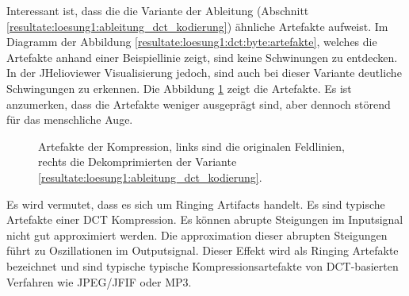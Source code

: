 Interessant ist, dass die die Variante der Ableitung (Abschnitt \ref{resultate:loesung1:ableitung_dct_kodierung}) ähnliche Artefakte aufweist. Im Diagramm der Abbildung \ref{resultate:loesung1:dct:byte:artefakte}, welches die Artefakte anhand einer Beispiellinie zeigt, sind keine Schwinungen zu entdecken. In der JHelioviewer Visualisierung jedoch, sind auch bei dieser Variante deutliche Schwingungen zu erkennen. Die Abbildung \ref{resultate:loesung1:dct:randbehandlung:jvhartefakte_loesung6} zeigt die Artefakte. Es ist anzumerken, dass die Artefakte weniger ausgeprägt sind, aber dennoch störend für das menschliche Auge.\\
\begin{figure}[!htbp]
	\center
	\caption{Artefakte der Kompression, links sind die originalen Feldlinien, rechts die Dekomprimierten der Variante \ref{resultate:loesung1:ableitung_dct_kodierung}.}
	\label{resultate:loesung1:dct:randbehandlung:jvhartefakte_loesung6}
\end{figure}
Es wird vermutet, dass es sich um Ringing Artifacts \cite{wiki:ringing:artefacts} handelt. 
Es sind typische Artefakte einer DCT Kompression. Es können abrupte Steigungen im Inputsignal nicht gut approximiert werden. Die approximation dieser abrupten Steigungen führt zu Oszillationen im Outputsignal. Dieser Effekt wird als Ringing Artefakte bezeichnet und sind typische typische Kompressionsartefakte von DCT-basierten Verfahren wie JPEG/JFIF oder MP3.\\
